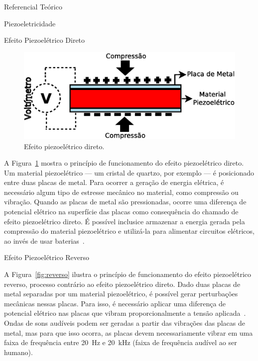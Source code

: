 \begin{chapter}{Referencial Teórico}
\begin{section}{Piezoeletricidade}
\begin{subsection}{Efeito Piezoelétrico Direto}
\begin{figure}[!h]
	\centering
	\begin{minipage}[c]{\textwidth}
	\centering
	\includegraphics[width=0.8\linewidth]{fig/EfeitoPiezoEletricoDireto}
	\caption{Efeito piezoelétrico direto.}
	\label{fig:direto}
	\end{minipage}
\end{figure}

A Figura~\ref{fig:direto} mostra o princípio de funcionamento do efeito
piezoelétrico direto. Um material piezoelétrico --- um cristal de quartzo, por
exemplo --- é posicionado entre duas placas de metal. Para ocorrer a geração de
energia elétrica, é necessário algum tipo de estresse mecânico no material, como
compressão ou vibração. Quando as placas de metal são pressionadas, ocorre uma
diferença de potencial elétrico na superfície das placas como consequência do
chamado de efeito piezoelétrico direto.  É possível inclusice armazenar a
energia gerada pela compressão do material piezoelétrico e utilizá-la para
alimentar circuitos elétricos, ao invés de usar baterias~\cite{twitter}. 

\end{subsection}


\begin{subsection}{Efeito Piezoelétrico Reverso}

A Figura~\ref{fig:reverso} ilustra o princípio de funcionamento do efeito
piezoelétrico reverso, processo contrário ao efeito piezoelétrico direto. Dado
duas placas de metal separadas por um material piezoelétrico, é possível gerar
perturbações mecânicas nessas placas. Para isso, é necessário aplicar uma
diferença de potencial elétrico nas placas que vibram proporcionalmente a tensão
aplicada~\cite{Lin12}. Ondas de sons audíveis podem ser geradas a partir das
vibrações das placas de metal, mas para que isso ocorra, as placas devem
necessariamente vibrar em uma faixa de frequência entre 20~Hz e 20~kHz (faixa de
frequência audível ao ser humano).



\end{subsection}
\end{section}
\end{chapter}
